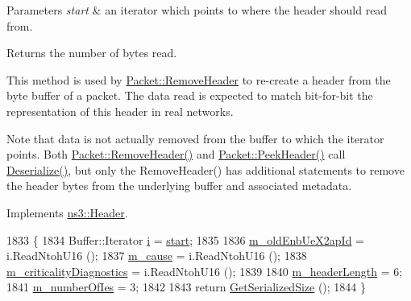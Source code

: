 \begin{DoxyParams}{Parameters}
{\em start} & an iterator which points to where the header should read from. \\
\hline
\end{DoxyParams}
\begin{DoxyReturn}{Returns}
the number of bytes read.
\end{DoxyReturn}
This method is used by \hyperlink{classns3_1_1Packet_a0961eccf975d75f902d40956c93ba63e}{Packet\+::\+Remove\+Header} to re-\/create a header from the byte buffer of a packet. The data read is expected to match bit-\/for-\/bit the representation of this header in real networks.

Note that data is not actually removed from the buffer to which the iterator points. Both \hyperlink{classns3_1_1Packet_a0961eccf975d75f902d40956c93ba63e}{Packet\+::\+Remove\+Header()} and \hyperlink{classns3_1_1Packet_aadc63487bea70945c418f4c3e9b81964}{Packet\+::\+Peek\+Header()} call \hyperlink{classns3_1_1EpcX2HandoverPreparationFailureHeader_ad92fd70a3a5292d19e6df4c30bca0826}{Deserialize()}, but only the Remove\+Header() has additional statements to remove the header bytes from the underlying buffer and associated metadata. 

Implements \hyperlink{classns3_1_1Header_a78be9400bb66b2a8543606f395ef5396}{ns3\+::\+Header}.


\begin{DoxyCode}
1833 \{
1834   Buffer::Iterator \hyperlink{bernuolliDistribution_8m_a6f6ccfcf58b31cb6412107d9d5281426}{i} = \hyperlink{namespacevisualizer_1_1core_a2a35e5d8a34af358b508dac8635754e0}{start};
1835 
1836   \hyperlink{classns3_1_1EpcX2HandoverPreparationFailureHeader_ab5eea0838833dc61a698ed04070e06d5}{m\_oldEnbUeX2apId} = i.ReadNtohU16 ();
1837   \hyperlink{classns3_1_1EpcX2HandoverPreparationFailureHeader_ac3f14501e0e39dcc348aa4ddcc9b8da1}{m\_cause} = i.ReadNtohU16 ();
1838   \hyperlink{classns3_1_1EpcX2HandoverPreparationFailureHeader_a7c2ea806241ee62302f90e51947e465f}{m\_criticalityDiagnostics} = i.ReadNtohU16 ();
1839 
1840   \hyperlink{classns3_1_1EpcX2HandoverPreparationFailureHeader_a8c82d898bfa520fa8a17454243d0dc4b}{m\_headerLength} = 6;
1841   \hyperlink{classns3_1_1EpcX2HandoverPreparationFailureHeader_ab530f263ee47d7e93a0acaeeaf30ded3}{m\_numberOfIes} = 3;
1842 
1843   \textcolor{keywordflow}{return} \hyperlink{classns3_1_1EpcX2HandoverPreparationFailureHeader_a2d3a6f751d6a486bdf9e72842d322cc4}{GetSerializedSize} ();
1844 \}
\end{DoxyCode}


